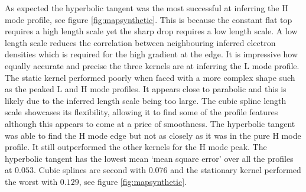 
As expected the hyperbolic tangent was the most successful at inferring the H mode profile, see figure \ref{fig:mapsynthetic}. This is because the constant flat top requires a high length scale yet the sharp drop requires a low length scale. A low length scale reduces the correlation between neighbouring inferred electron densities which is required for the high gradient at the edge. It is impressive how equally accurate and precise the three kernels are at inferring the L mode profile. The static kernel performed poorly when faced with a more complex shape such as the peaked L and H mode profiles. It appears close to parabolic and this is likely due to the inferred length scale being too large. The cubic spline length scale showcases its flexibility, allowing it to find some of the profile features although this appears to come at a price of smoothness. The hyperbolic tangent was able to find the H mode edge but not as closely as it was in the pure H mode profile. It still outperformed the other kernels for the H mode peak. The hyperbolic tangent has the lowest mean `mean square error' over all the profiles at $0.053$. Cubic splines are second with $0.076$ and the stationary kernel performed the worst with $0.129$, see figure \ref{fig:mapsynthetic}.

